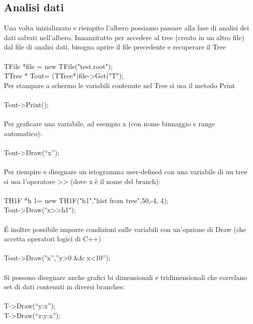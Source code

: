 \documentclass[10pt,a4paper]{article}
\begin{document}
\subsection{Analisi dati}
Una volta inizializzato e riempito l'albero possiamo passare alla fase di analisi dei dati salvati nell'albero. Innanzitutto per accedere al tree (creato in un altro file)  dal file di analisi dati, bisogna aprire il file precedente e recuperare il Tree\\\\
TFile *file = new TFile("test.root");\\
TTree * Tout= (TTree*)file->Get("T");\\
Per stampare a schermo le variabili contenute nel Tree si usa il metodo Print\\\\
Tout->Print();\\\\
Per graficare una variabile, ad esempio x (con nome binnaggio e range automatico):\\\\
Tout->Draw(“x”);\\\\
Per riempire e disegnare un istogramma user-defined con una variabile di un tree si usa l'operatore >> (dove x è il nome del branch):\\\\
TH1F *h 1= new TH1F("h1","hist from tree",50,-4, 4);\\
Tout->Draw("x>>h1");\\\\
\'E inoltre possibile imporre condizioni sulle variabili con un'opzione di Draw (che accetta operatori logici di C++)\\\\
Tout->Draw("x”,”y>0 \&\& x<10”);\\\\
Si possono disegnare anche grafici bi dimensionali e tridimensionali che correlano set di dati contenuti in diversi branches:\\\\
T->Draw(“y:x”);\\
T->Draw(“z:y:x”);\\
\newpage
\end{document}
